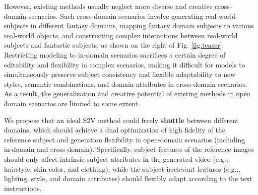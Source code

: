 \documentclass{llmxive}
\providecommand{\eg}{e.g.,\xspace}
\begin{document}
However, existing methods usually neglect more diverse and creative cross-domain scenarios. Such cross-domain scenarios involve generating real-world subjects in different fantasy domains, mapping fantasy domain subjects to various real-world objects, and constructing complex interactions between real-world subjects and fantastic subjects, as shown on the right of Fig. \ref{fig:teaser}. Restricting modeling to in-domain scenarios sacrifices a certain degree of editability and flexibility in complex scenarios, making it difficult for models to simultaneously preserve subject consistency and flexible adaptability to new styles, semantic combinations, and domain attributes in cross-domain scenarios. As a result, the generalization and creative potential of existing methods in open domain scenarios are limited to some extent.


We propose that an ideal S2V method could freely \textbf{shuttle} between different domains, which should achieve a dual optimization of high fidelity of the reference subject and generation flexibility in open-domain scenarios (including in-domain and cross-domain). Specifically, subject features of the reference images should only affect intrinsic subject attributes in the generated video (\eg, hairstyle, skin color, and clothing), while the subject-irrelevant features (\eg, lighting, style, and domain attributes) should flexibly adapt according to the text instructions.
\end{document}
